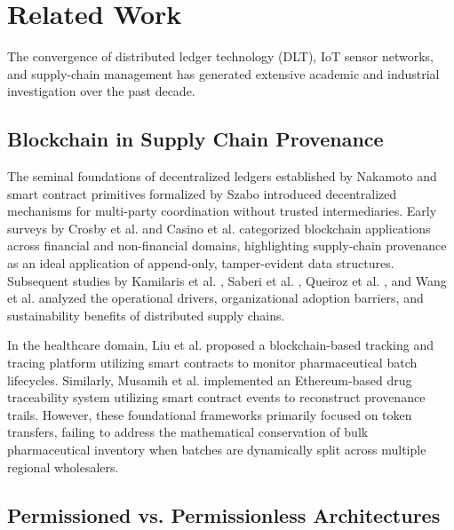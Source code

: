 \documentclass[pdflatex,sn-mathphys-num]{sn-jnl}
\theoremstyle{thmstyleone}
\theoremstyle{thmstyletwo}
\theoremstyle{thmstylethree}
\begin{document}

\section{Related Work}\label{sec:related-work}

The convergence of distributed ledger technology (DLT), IoT sensor networks, and supply-chain management has generated extensive academic and industrial investigation over the past decade.

\subsection{Blockchain in Supply Chain Provenance}

The seminal foundations of decentralized ledgers established by Nakamoto \cite{nakamoto2008bitcoin} and smart contract primitives formalized by Szabo \cite{szabo1997formalizing} introduced decentralized mechanisms for multi-party coordination without trusted intermediaries. Early surveys by Crosby et al. \cite{crosby2016blockchain} and Casino et al. \cite{casino2019systematic} categorized blockchain applications across financial and non-financial domains, highlighting supply-chain provenance as an ideal application of append-only, tamper-evident data structures. Subsequent studies by Kamilaris et al. \cite{kamilaris2019rise}, Saberi et al. \cite{saberi2019blockchain}, Queiroz et al. \cite{queiroz2020blockchain}, and Wang et al. \cite{wang2019understanding} analyzed the operational drivers, organizational adoption barriers, and sustainability benefits of distributed supply chains.

In the healthcare domain, Liu et al. \cite{liu2021blockchain} proposed a blockchain-based tracking and tracing platform utilizing smart contracts to monitor pharmaceutical batch lifecycles. Similarly, Musamih et al. \cite{musamih2021blockchain} implemented an Ethereum-based drug traceability system utilizing smart contract events to reconstruct provenance trails. However, these foundational frameworks primarily focused on token transfers, failing to address the mathematical conservation of bulk pharmaceutical inventory when batches are dynamically split across multiple regional wholesalers.

\subsection{Permissioned vs. Permissionless Architectures}
\end{document}
